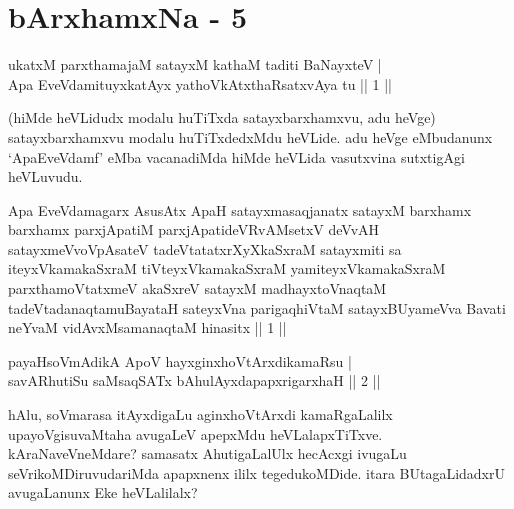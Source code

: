 \chapter{bArxhamxNa - 5}


\begin{shl}
ukatxM parxthamajaM satayxM kathaM taditi BaNayxteV | \\
Apa EveVdamituyxkatAyx yathoVkAtxthaRsatxvAya tu \hfill ||  1 || 
\end{shl}

\begin{artha}
(hiMde heVLidudx modalu huTiTxda satayxbarxhamxvu, adu heVge) satayxbarxhamxvu modalu huTiTxdedxMdu heVLide. adu heVge eMbudanunx `ApaEveVdamf' eMba vacanadiMda hiMde heVLida vasutxvina sutxtigAgi heVLuvudu.
\end{artha}


\begin{kandikeshl}
Apa EveVdamagarx AsusAtx ApaH satayxmasaqjanatx satayxM barxhamx barxhamx parxjApatiM parxjApatideVRvAMsetxV deVvAH satayxmeVvoVpAsateV tadeVtatatxrXyXkaSxraM satayxmiti sa iteyxVkamakaSxraM tiVteyxVkamakaSxraM yamiteyxVkamakaSxraM parxthamoVtatxmeV akaSxreV satayxM madhayxtoV\s naqtaM tadeVtadanaqtamuBayataH sateyxVna parigaqhiVtaM satayxBUyameVva Bavati neYvaM vidAvxMsamanaqtaM hinasitx || 1 ||
\end{kandikeshl}


\begin{shl}
payaHsoVmAdikA ApoV hayxginxhoVtArxdikamaRsu | \\
savARhutiSu saMsaqSATx bAhulAyxdapapxrigarxhaH \hfill ||  2 || 
\end{shl}

\begin{artha}
hAlu, soVmarasa itAyxdigaLu aginxhoVtArxdi kamaRgaLalilx upayoVgisuvaMtaha avugaLeV apepxMdu heVLalapxTiTxve. kAraNaveVneMdare? samasatx AhutigaLalUlx hecAcxgi ivugaLu seVrikoMDiruvudariMda apapxnenx ililx tegedukoMDide. itara BUtagaLidadxrU avugaLanunx Eke heVLalilalx?
\end{artha}


